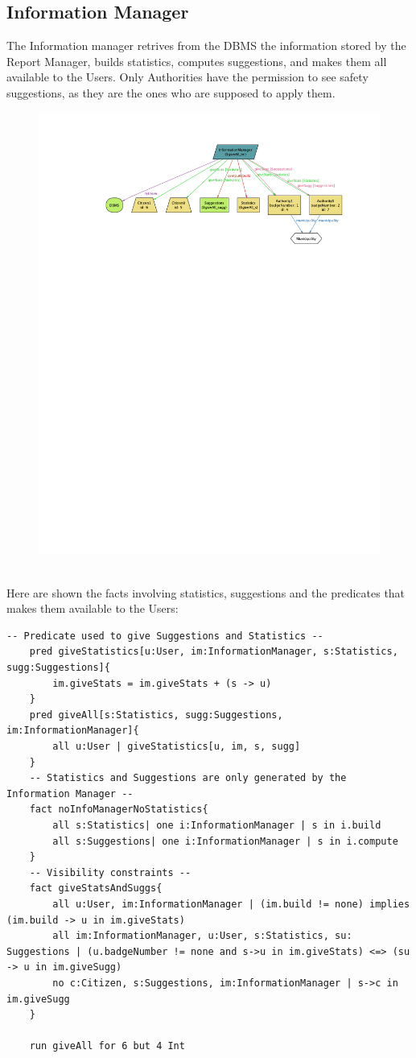 \documentclass{report}
\begin{document}
\subsection{Information Manager}
The Information manager retrives from the DBMS the information stored by the Report Manager, builds statistics, computes suggestions, and makes them all available to the Users. Only Authorities have the permission to see safety suggestions, as they are the ones who are supposed to apply them.
\begin{figure}[ht!]
	\begin{center}
	\includegraphics[width=.8\textwidth]{./img/giveAll.pdf}
	\label{fig:allgive}
	\caption{}
	\end{center}
\end{figure}\\
Here are shown the facts involving statistics, suggestions and the predicates that makes them available to the Users:
\begin{lstlisting}[language=alloy]
	-- Predicate used to give Suggestions and Statistics --
	pred giveStatistics[u:User, im:InformationManager, s:Statistics, sugg:Suggestions]{
		im.giveStats = im.giveStats + (s -> u)
	}
	pred giveAll[s:Statistics, sugg:Suggestions, im:InformationManager]{
		all u:User | giveStatistics[u, im, s, sugg]
	}
	-- Statistics and Suggestions are only generated by the Information Manager --
	fact noInfoManagerNoStatistics{
		all s:Statistics| one i:InformationManager | s in i.build 
		all s:Suggestions| one i:InformationManager | s in i.compute
	}
	-- Visibility constraints --
	fact giveStatsAndSuggs{
		all u:User, im:InformationManager | (im.build != none) implies (im.build -> u in im.giveStats)
		all im:InformationManager, u:User, s:Statistics, su: Suggestions | (u.badgeNumber != none and s->u in im.giveStats) <=> (su -> u in im.giveSugg)
		no c:Citizen, s:Suggestions, im:InformationManager | s->c in im.giveSugg
	}

	run giveAll for 6 but 4 Int
\end{lstlisting}
\end{document}
